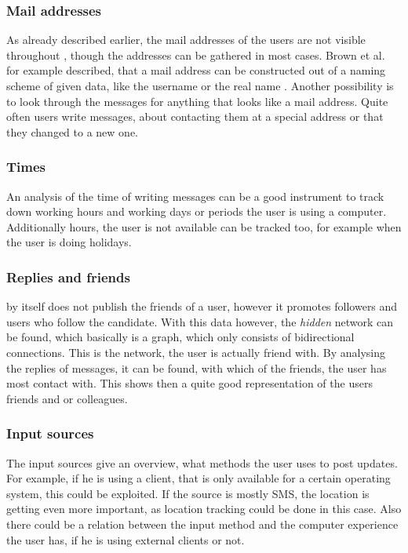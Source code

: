 \subsubsection{Mail addresses}

As already described earlier, the mail addresses of the users are not visible
throughout \Twitter{}, though the addresses can be gathered in most cases.
Brown et al. for example described, that a mail address can be constructed out
of a naming scheme of given data, like the username or the real name
\cite{brown2008}. Another possibility is to look through the messages for
anything that looks like a mail address. Quite often users write messages,
about contacting them at a special address or that they changed to a new one.

\subsubsection{Times}

An analysis of the time of writing messages can be a good instrument to track
down working hours and working days or periods the user is using a computer.
Additionally hours, the user is not available can be tracked too, for example
when the user is doing holidays.

\subsubsection{Replies and friends}

\Twitter{} by itself does not publish the friends of a user, however it
promotes followers and users who follow the candidate. With this data however,
the \textit{hidden} network can be found, which basically is a graph, which
only consists of bidirectional connections. This is the network, the user is
actually friend with. By analysing the replies of messages, it can be found,
with which of the friends, the user has most contact with. This shows then a
quite good representation of the users friends and or colleagues.

\subsubsection{Input sources}

The \Twitter{} input sources give an overview, what methods the user uses to
post updates. For example, if he is using a \Twitter{} client, that is only
available for a certain operating system, this could be exploited. If the
source is mostly SMS, the location is getting even more important, as location
tracking could be done in this case. Also there could be a relation between the
input method and the computer experience the user has, if he is using external
clients or not.

